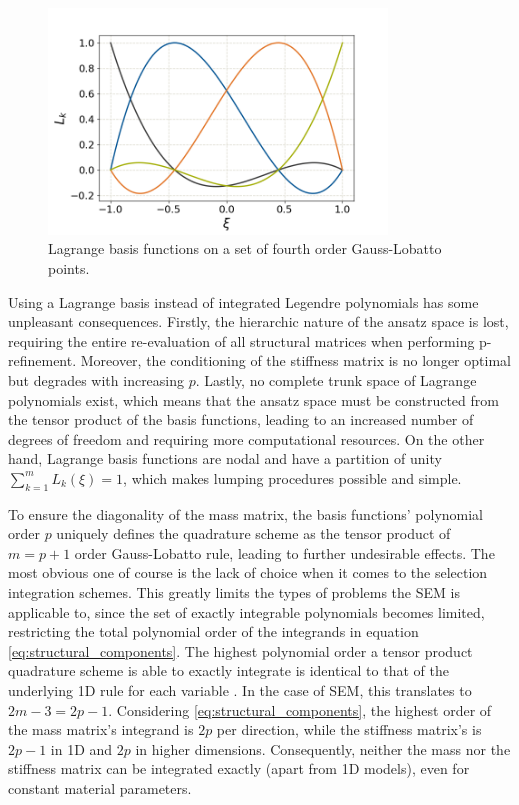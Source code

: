 \begin{figure}[h]
	\centering
	\includegraphics[height=6cm]{pictures/figures/lagrange_basis.png}
	\caption{Lagrange basis functions on a set of fourth order Gauss-Lobatto points.}
	\label{fig:lagrange_basis}
\end{figure}

Using a Lagrange basis instead of integrated Legendre polynomials has some unpleasant consequences. Firstly, the hierarchic nature of the ansatz space is lost, requiring the entire re-evaluation of all structural matrices when performing p-refinement. Moreover, the conditioning of the stiffness matrix is no longer optimal \cite{Zumbusch1996} but degrades with increasing $p$. Lastly, no complete trunk space of Lagrange polynomials exist, which means that the ansatz space must be constructed from the tensor product of the basis functions, leading to an increased number of degrees of freedom and requiring more computational resources.
On the other hand, Lagrange basis functions are nodal and have a partition of unity $\sum_{k=1}^m L_k(\xi) = 1$, which makes lumping procedures possible and simple.

To ensure the diagonality of the mass matrix, the basis functions' polynomial order $p$ uniquely defines the quadrature scheme as the tensor product of $m=p+1$ order Gauss-Lobatto rule, leading to further undesirable effects. The most obvious one of course is the lack of choice when it comes to the selection integration schemes.
This greatly limits the types of problems the SEM is applicable to, since the set of exactly integrable polynomials becomes limited, restricting the total polynomial order of the integrands in equation \ref{eq:structural_components}. The highest polynomial order a tensor product quadrature scheme is able to exactly integrate is identical to that of the underlying 1D rule for each variable \cite{Keister1996}. In the case of SEM, this translates to $2m-3=2p-1$. Considering \ref{eq:structural_components}, the highest order of the mass matrix's integrand is $2p$ per direction, while the stiffness matrix's is $2p-1$ in 1D and $2p$ in higher dimensions. Consequently, neither the mass nor the stiffness matrix can be integrated exactly (apart from 1D models), even for constant material parameters.

